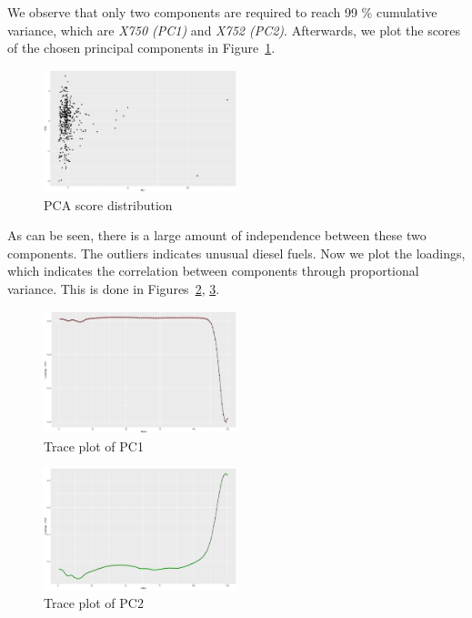 \documentclass[a4paper, twocolumn]{article}
\begin{document}
        We observe that only two components are required to reach 99 \% cumulative variance, which are \emph{X750 (PC1)} and \emph{X752 (PC2)}. Afterwards, we plot the scores of the chosen principal components in Figure~\ref{fig:pcascore}.

        \begin{figure}[h!]
            \centering
            \caption{PCA score distribution}
            \label{fig:pcascore}
            \includegraphics[width=0.5\textwidth]{share/A2_pcascore.eps}
        \end{figure}

        As can be seen, there is a large amount of independence between these two components. The outliers indicates unusual diesel fuels. Now we plot the loadings, which indicates the correlation between components through proportional variance. This is done in Figures~\ref{fig:x750tp}, \ref{fig:x752tp}. 

        \begin{figure}[h!]
            \centering
            \caption{Trace plot of PC1}
            \label{fig:x750tp}
            \includegraphics[width=0.5\textwidth]{share/A2_trace_PC1.eps}
        \end{figure}

        \begin{figure}[h!]
            \centering
            \caption{Trace plot of PC2}
            \label{fig:x752tp}
            \includegraphics[width=0.5\textwidth]{share/A2_trace_PC2.eps}
        \end{figure}
\end{document}
